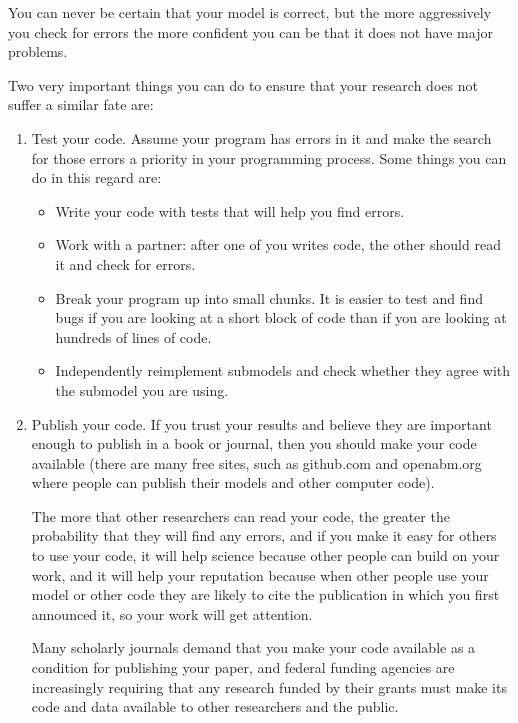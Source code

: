 \documentclass[]{article}
\providecommand{\tightlist}{%
  \setlength{\itemsep}{0pt}\setlength{\parskip}{0pt}}
\begin{document}
You can never be certain that your model is correct, but the more
aggressively you check for errors the more confident you can be that it
does not have major problems.

Two very important things you can do to ensure that your research does
not suffer a similar fate are:

\begin{enumerate}
\def\labelenumi{\arabic{enumi}.}
\item
  Test your code. Assume your program has errors in it and make the
  search for those errors a priority in your programming process. Some
  things you can do in this regard are:

  \begin{itemize}
  \tightlist
  \item
    Write your code with tests that will help you find errors.
  \item
    Work with a partner: after one of you writes code, the other should
    read it and check for errors.
  \item
    Break your program up into small chunks. It is easier to test and
    find bugs if you are looking at a short block of code than if you
    are looking at hundreds of lines of code.
  \item
    Independently reimplement submodels and check whether they agree
    with the submodel you are using.
  \end{itemize}
\item
  Publish your code. If you trust your results and believe they are
  important enough to publish in a book or journal, then you should make
  your code available (there are many free sites, such as github.com and
  openabm.org where people can publish their models and other computer
  code).

  The more that other researchers can read your code, the greater the
  probability that they will find any errors, and if you make it easy
  for others to use your code, it will help science because other people
  can build on your work, and it will help your reputation because when
  other people use your model or other code they are likely to cite the
  publication in which you first announced it, so your work will get
  attention.

  Many scholarly journals demand that you make your code available as a
  condition for publishing your paper, and federal funding agencies are
  increasingly requiring that any research funded by their grants must
  make its code and data available to other researchers and the public.
\end{enumerate}
\end{document}
